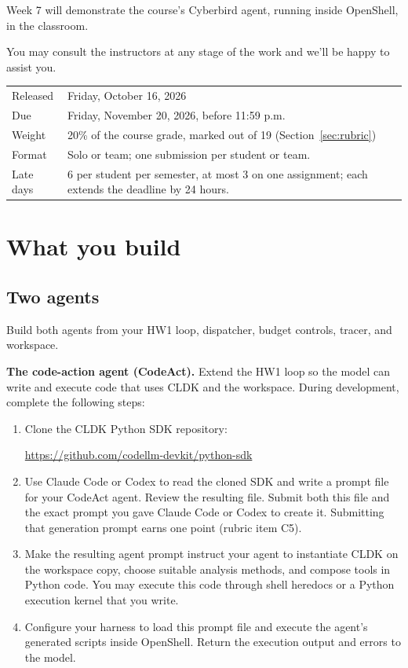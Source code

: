 \documentclass[9pt,letterpaper]{article}
\begin{document}
Week 7 will demonstrate the course's Cyberbird agent, running inside OpenShell, in the classroom.

You may consult the instructors at any stage of the work and we'll be happy to assist you.

\begin{center}
\begin{tabularx}{\linewidth}{@{}lX@{}}
\toprule
Released & Friday, October 16, 2026 \\
Due & Friday, November 20, 2026, before 11:59 p.m. \\
Weight & 20\% of the course grade, marked out of 19 (Section~\ref{sec:rubric}) \\
Format & Solo or team; one submission per student or team. \\
Late days & 6 per student per semester, at most 3 on one assignment; each extends the deadline by 24 hours. \\
\bottomrule
\end{tabularx}
\end{center}

\section{What you build}\label{sec:build}

\subsection{Two agents}\label{sec:agents}

Build both agents from your HW1 loop, dispatcher, budget controls, tracer, and
workspace.

\textbf{The code-action agent (CodeAct).} Extend the HW1 loop so the model can
write and execute code that uses CLDK and the workspace. During development,
complete the following steps:
\begin{enumerate}
\item Clone the CLDK Python SDK repository:
  \par\noindent\url{https://github.com/codellm-devkit/python-sdk}\par
\item Use Claude Code or Codex to read the cloned SDK and write a prompt file
  for your CodeAct agent. Review the resulting file. Submit both this file and
  the exact prompt you gave Claude Code or Codex to create it. Submitting that
  generation prompt earns one point (rubric item C5).
\item Make the resulting agent prompt instruct your agent to instantiate CLDK
  on the workspace copy, choose suitable analysis methods, and compose tools in
  Python code. You may execute this code through shell heredocs or a Python
  execution kernel that you write.
\item Configure your harness to load this prompt file and execute the agent's
  generated scripts inside OpenShell. Return the execution output and errors to
  the model.
\end{enumerate}
\end{document}
